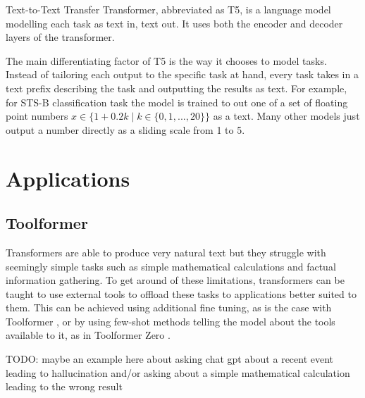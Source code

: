 \documentclass[twoside]{article}
\begin{document}
Text-to-Text Transfer Transformer, abbreviated as T5, is a language model modelling each
task as text in, text out. It uses both the encoder and decoder layers of the transformer.
\cite{raffel_exploring_2020}

The main differentiating factor of T5 is the way it chooses to model tasks. Instead of 
tailoring each output to the specific task at hand, every task takes in a text prefix
describing the task and outputting the results as text. For example, for STS-B classification
task the model is trained to out one of a set of floating point numbers 
$x \in \{ 1+0.2k \mid k \in \{ 0, 1, ..., 20\} \}$ as a text. Many other models just 
output a number directly as a sliding scale from 1 to 5. 

\section{Applications}

\subsection{Toolformer}
Transformers are able to produce very natural text but they struggle with seemingly
simple tasks such as simple mathematical calculations and factual information gathering.
To get around of these limitations, transformers can be taught to use external tools
to offload these tasks to applications better suited to them. \cite{schick_toolformer_2023} 
This can be achieved using additional fine tuning, as is the case with Toolformer
\cite{schick_toolformer_2023}, or by using few-shot methods telling the model 
about the tools available to it, as in Toolformer Zero \cite{markus_toolformer_2023}.

TODO: maybe an example here about asking chat gpt about a recent event leading to hallucination
and/or asking about a simple mathematical calculation leading to the wrong result




\printbibliography
\end{document}
